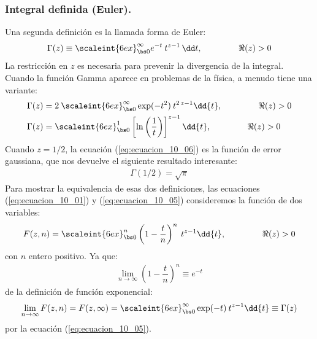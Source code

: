 \subsubsection{Integral definida (Euler).}

Una segunda definición es la llamada forma de Euler:
\begin{align}
\Gamma (z) \equiv \scaleint{6ex}_{\bs 0}^{\infty} e^{-t} \: t^{z - 1} \, \dd t, \hspace{1.5cm} \Re(z) > 0
\label{eq:ecuacion_10_05}
\end{align}
La restricción en $z$ es necesaria para prevenir la divergencia de la integral. Cuando la función Gamma aparece en problemas de la física, a menudo tiene una variante:
\begin{align}
\Gamma (z) &= 2 \: \scaleint{6ex}_{\bs 0}^{\infty} \exp(-t^{2}) \: t^{2 \, z - 1} \dd{t}, \hspace{1.5cm} \Re(z) > 0  \label{eq:ecuacion_10_06} \\
\Gamma (z) &=  \scaleint{6ex}_{\bs 0}^{1} \left[ \ln\left(\dfrac{1}{t} \right) \right]^{z - 1} \dd{t}, \hspace{1.5cm} \Re (z) > 0 \label{eq:ecuacion_10_07}
\end{align}
Cuando $z=1/2$, la ecuación (\ref{eq:ecuacion_10_06}) es la función de error gaussiana, que nos devuelve el siguiente resultado interesante:
\begin{align}
\Gamma (1/2) = \sqrt{\pi}
\label{eq:ecuacion_10_08}
\end{align}
Para mostrar la equivalencia de esas dos definiciones, las ecuaciones (\ref{eq:ecuacion_10_01}) y (\ref{eq:ecuacion_10_05}) consideremos la función de dos variables:
\begin{align}
F(z, n) = \scaleint{6ex}_{\bs 0}^{n} \left( 1 - \dfrac{t}{n} \right)^{n} \: t^{z - 1} \dd{t}, \hspace{1.5cm} \Re(z) > 0
\label{eq:ecuacion_10_09}
\end{align}
con $n$ entero positivo. Ya que:
\begin{align}
\lim_{n \to \infty} \left( 1 - \dfrac{t}{n} \right)^{n} \equiv e^{-t}
\label{eq:ecuacion_10_10}
\end{align}
de la definición de función exponencial:
\begin{equation}
\lim_{n \to \infty} F(z, n) = F(z, \infty) = \scaleint{6ex}_{\bs 0}^{\infty} \exp(-t) \: t^{z - 1} \dd{t} \equiv \Gamma (z)
\label{eq:ecuacion_10_11}
\end{equation}
por la ecuación (\ref{eq:ecuacion_10_05}).
